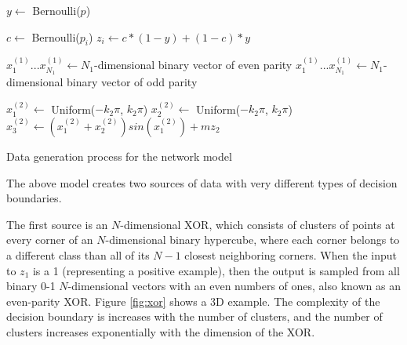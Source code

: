 \documentclass{article}
\begin{document}
\begin{algorithm}
\centering
\begin{algorithmic}[1]
    \item[] 
    \State $y \leftarrow$ Bernoulli($p$)

    \item[]
    \item[] 
        \State $c \leftarrow$ Bernoulli($p_i$) 
        \State $z_i \leftarrow c * (1-y) + (1-c) * y$ 
    \EndFor

    \item[]
    \item[] 
        \State $x^{(1)}_1 ... x^{(1)}_{N_1} \leftarrow N_1$-dimensional binary
        vector of even parity
    \Else
        \State $x^{(1)}_1 ... x^{(1)}_{N_1} \leftarrow N_1$-dimensional binary
        vector of odd parity
    \EndIf

    \item[]
    \item[] 
    \State $x^{(2)}_1 \leftarrow $ Uniform($-k_2\pi$, $k_2\pi$)
    \State $x^{(2)}_2 \leftarrow $ Uniform($-k_2\pi$, $k_2\pi$)
    \State $x^{(2)}_3 \leftarrow (x^{(2)}_1+x^{(2)}_2)sin(x^{(2)}_1) + mz_2$
\end{algorithmic}
\caption{Data generation process for the network model}
\label{alg:network_model}
\end{algorithm}


The above model creates two sources of data with very different types of
decision boundaries.

The first source is an $N$-dimensional XOR, which consists of clusters of
points at every corner of an $N$-dimensional binary hypercube, where each
corner belongs to a different class than all of its $N-1$ closest neighboring
corners. When the input to $z_1$ is a 1 (representing a positive example), then
the output is sampled from all binary 0-1 $N$-dimensional vectors with an even
numbers of ones, also known as an even-parity XOR. Figure \ref{fig:xor} shows a
3D example. The complexity of the decision boundary is increases with the
number of clusters, and the number of clusters increases exponentially with the
dimension of the XOR.
\end{document}
